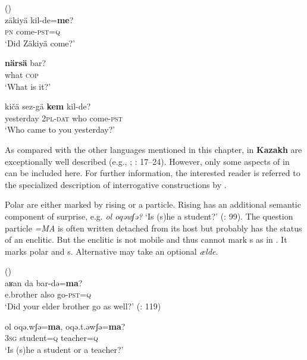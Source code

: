 \ea%
    \label{ex:turk:10}
     ()\\
    \ea
    \gll zäkiyä    kil-de=\textbf{{me}}?\\
    \textsc{pn}    come-\textsc{pst}=\textsc{q}\\
    \glt ‘Did Zäkiyä come?’
    
    \ex
    \gll \textbf{{närsä}} bar?\\
    what  \textsc{cop}\\
    \glt ‘What is it?’
    
    \ex
    \gll kičä    sez-gä \textbf{{kem}} kil-de?\\
    yesterday  2\textsc{pl}-\textsc{dat} who  come-\textsc{pst}\\
    \glt ‘Who came to you yesterday?’ \citep[126]{Poppe1963}\z\z

As compared with the other  languages mentioned in this chapter,  in \textbf{Kazakh} are exceptionally well described (e.g., \citealt{GengShiminLiZengxiang1985}; \citealt{Muhamedowa2016}: 17--24). However, only some aspects of  in  can be included here. For further information, the interested reader is referred to the specialized description of  interrogative constructions by \citet{ZhangDingjing1991}.

Polar  are either marked by rising  or a particle. Rising  has an additional semantic component of surprise, e.g. \textit{ol oqəwʃə?} ‘Is (s)he a student?’ (\citealt{ZhangDingjing1991}: 99). The question particle \textit{=MA} is often written detached from its host but probably has the status of an enclitic. But the enclitic is not mobile and thus cannot mark s as in  \citep[17]{Muhamedowa2016}. It marks polar and s. Alternative  may take an optional  \textit{ælde}.

\ea%
    \label{ex:turk:11}
     ()\\
    \ea
    \gll aʁan    da  bar-də=\textbf{{ma}}?\\
    e.brother  also  go-\textsc{pst=q}\\
    \glt ‘Did your elder brother go as well?’ (\citealt{GengShiminLiZengxiang1985}: 119)
    
    \ex
    \gll ol  oqə.wʃə=\textbf{{ma}},    oqə.t.əwʃə=\textbf{{ma}}?\\
    3\textsc{sg}  student=\textsc{q}    teacher=\textsc{q}\\
    \glt ‘Is (s)he a student or a teacher?’
    
